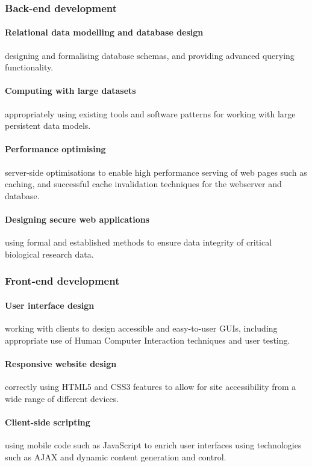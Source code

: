 \subsubsection{Back-end development}

\paragraph{Relational data modelling and database design} designing and
formalising database schemas, and providing advanced querying functionality.

\paragraph{Computing with large datasets} appropriately using existing tools and
software patterns for working with large persistent data models.

\paragraph{Performance optimising} server-side optimisations to enable high
performance serving of web pages such as caching, and successful cache
invalidation techniques for the webserver and database.

\paragraph{Designing secure web applications} using formal and established
methods to ensure data integrity of critical biological research data.

\subsubsection{Front-end development}

\paragraph{User interface design} working with clients to design accessible and
easy-to-user GUIs, including appropriate use of Human Computer Interaction
techniques and user testing.

\paragraph{Responsive website design} correctly using HTML5 and CSS3 features to
allow for site accessibility from a wide range of different devices.

\paragraph{Client-side scripting} using mobile code such as JavaScript to enrich
user interfaces using technologies such as AJAX and dynamic content generation
and control.
